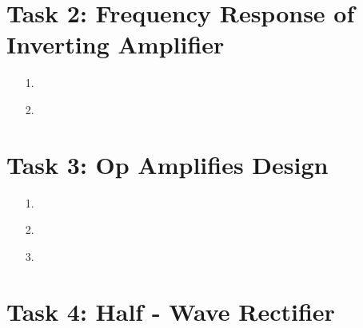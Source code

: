 \documentclass[11pt,a4paper]{article}
\begin{document}
\section*{Task 2: Frequency Response of Inverting Amplifier}

\begin{enumerate}
  \item[1.]
  
  \item[2.]
  
\end{enumerate}

\section*{Task 3: Op Amplifies Design}

\begin{enumerate}
  \item[1.]
  
  \item[2.]
  
  \item[3.]
  
\end{enumerate}

\section*{Task 4: Half - Wave Rectifier}
\end{document}
